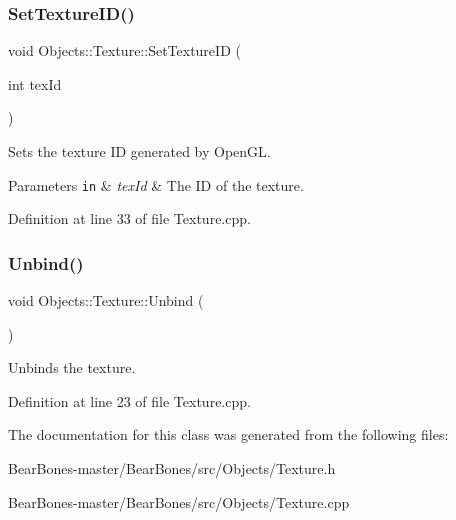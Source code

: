 \mbox{\label{class_objects_1_1_texture_ab64d6c23647133c9bd86ca9a457bae77}} 
\subsubsection{\texorpdfstring{Set\+Texture\+I\+D()}{SetTextureID()}}
{\footnotesize\ttfamily void Objects\+::\+Texture\+::\+Set\+Texture\+ID (\begin{DoxyParamCaption}\item[{int}]{tex\+Id }\end{DoxyParamCaption})}

Sets the texture ID generated by Open\+GL. 
\begin{DoxyParams}[1]{Parameters}
\mbox{\tt in}  & {\em tex\+Id} & The ID of the texture. \\
\hline
\end{DoxyParams}


Definition at line 33 of file Texture.\+cpp.

\mbox{\label{class_objects_1_1_texture_aecfe36e814417cf874c1145f28320f7f}} 
\subsubsection{\texorpdfstring{Unbind()}{Unbind()}}
{\footnotesize\ttfamily void Objects\+::\+Texture\+::\+Unbind (\begin{DoxyParamCaption}{ }\end{DoxyParamCaption})}

Unbinds the texture. 

Definition at line 23 of file Texture.\+cpp.



The documentation for this class was generated from the following files\+:\begin{DoxyCompactItemize}
\item 
Bear\+Bones-\/master/\+Bear\+Bones/src/\+Objects/Texture.\+h\item 
Bear\+Bones-\/master/\+Bear\+Bones/src/\+Objects/Texture.\+cpp\end{DoxyCompactItemize}
